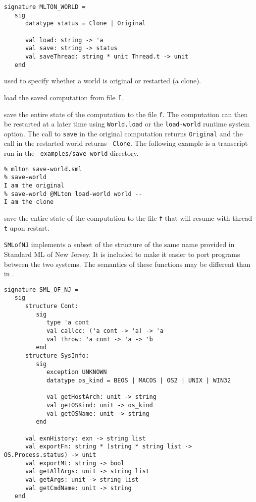 \begin{verbatim}
signature MLTON_WORLD =
   sig
      datatype status = Clone | Original

      val load: string -> 'a
      val save: string -> status
      val saveThread: string * unit Thread.t -> unit
   end
\end{verbatim}

\begin{description}
used to specify whether a world is original or restarted (a clone).

load the saved computation from file {\tt f}.

save the entire state of the computation to
the file {\tt f}.  The computation can then be restarted at a later
time using {\tt World.load} or the {\tt load-world} runtime system
option.  The call to {\tt save} in the original computation returns
{\tt Original} and the call in the restarted world returns {\tt
Clone}.  The following example is a transcript run in the {\tt
examples/save-world} directory.
\begin{verbatim}
% mlton save-world.sml
% save-world
I am the original
% save-world @MLton load-world world --
I am the clone
\end{verbatim}

save the entire state of the computation to
the file {\tt f} that will resume with thread {\tt t} upon restart.

\end{description}
%

{\tt SMLofNJ} implements a subset of the structure of the same name
provided in Standard ML of New Jersey.  It is included to make it
easier to port programs between the two systems.  The semantics of
these functions may be different than in {\smlnj}.

\begin{verbatim}
signature SML_OF_NJ =
   sig
      structure Cont:
         sig
            type 'a cont
            val callcc: ('a cont -> 'a) -> 'a
            val throw: 'a cont -> 'a -> 'b
         end
      structure SysInfo:
         sig
            exception UNKNOWN
            datatype os_kind = BEOS | MACOS | OS2 | UNIX | WIN32

            val getHostArch: unit -> string
            val getOSKind: unit -> os_kind
            val getOSName: unit -> string
         end

      val exnHistory: exn -> string list
      val exportFn: string * (string * string list -> OS.Process.status) -> unit
      val exportML: string -> bool
      val getAllArgs: unit -> string list
      val getArgs: unit -> string list
      val getCmdName: unit -> string
   end
\end{verbatim}

